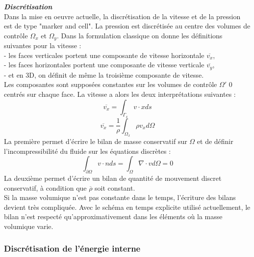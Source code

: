 \textit{\textbf{Discr\'etisation}}\smallskip \\

Dans la mise en oeuvre actuelle, la discr\'etisation de la vitesse et de la pression est de type "marker and cell". La pression est discr\'etis\'ee au centre des volumes de contr\^ole $\Omega_{x}$ et $\Omega_{y}$. Dans la formulation classique on donne les d\'efinitions suivantes pour la vitesse :\\
- les faces verticales portent une composante de vitesse horizontale $\overline{v_{x}}$,\\
- les faces horizontales portent une composante de vitesse verticale $\overline{v_{y}}$,\\
- et en 3D, on d\'efinit de même la troisi\`eme composante de vitesse.\\
Les composantes sont suppos\'ees constantes sur les volumes de contr\^ole $\Omega'$ 0 centr\'es sur chaque face. La vitesse a alors les deux interpr\'etations suivantes :
\begin{equation}
\overline{v_{x}} = \int_{\Gamma_{x}} v \cdot x ds
\end{equation}
\begin{equation}
\overline{v_{x}} = \dfrac{1}{\rho} \int_{\Omega_{x}} \rho v_{x} d\Omega
\end{equation}
La premi\`ere permet d'\'ecrire le bilan de masse conservatif sur $\Omega$ et de d\'efinir l'incompressibilit\'e du fluide sur les \'equations discr\`etes :
\begin{equation}
\int_{\partial\Omega} v \cdot n ds = \int_{\Omega} \nabla \cdot v d\Omega = 0
\end{equation}
La deuxi\`eme permet d'\'ecrire un bilan de quantit\'e de mouvement discret conservatif, \`a condition que $\overline{\rho}$ soit constant.\\
Si la masse volumique n'est pas constante dans le temps, l'\'ecriture des bilans
devient tr\`es compliqu\'ee. Avec le sch\'ema en temps explicite utilis\'e actuellement, le bilan n'est respect\'e qu'approximativement dans les \'el\'ements o\`u la masse volumique varie.

\subsubsection{Discr\'etisation de l'\'energie interne}

